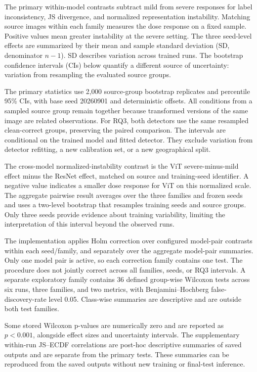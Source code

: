 The primary within-model contrasts subtract mild from severe responses for label inconsistency, JS divergence, and normalized representation instability. Matching source images within each family measures the dose response on a fixed sample. Positive values mean greater instability at the severe setting. The three seed-level effects are summarized by their mean and sample standard deviation (SD, denominator \(n-1\)). SD describes variation across trained runs. The bootstrap confidence intervals (CIs) below quantify a different source of uncertainty: variation from resampling the evaluated source groups.

The primary statistics use 2,000 source-group bootstrap replicates and percentile 95\% CIs, with base seed 20260901 and deterministic offsets. All conditions from a sampled source group remain together because transformed versions of the same image are related observations. For RQ3, both detectors use the same resampled clean-correct groups, preserving the paired comparison. The intervals are conditional on the trained model and fitted detector. They exclude variation from detector refitting, a new calibration set, or a new geographical split.

The cross-model normalized-instability contrast is the ViT severe-minus-mild effect minus the ResNet effect, matched on source and training-seed identifier. A negative value indicates a smaller dose response for ViT on this normalized scale. The aggregate pairwise result averages over the three families and frozen seeds and uses a two-level bootstrap that resamples training seeds and source groups. Only three seeds provide evidence about training variability, limiting the interpretation of this interval beyond the observed runs.

The implementation applies Holm correction over configured model-pair contrasts within each seed/family, and separately over the aggregate model-pair summaries. Only one model pair is active, so each correction family contains one test. The procedure does not jointly correct across all families, seeds, or RQ3 intervals. A separate exploratory family contains 36 defined group-wise Wilcoxon tests across six runs, three families, and two metrics, with Benjamini--Hochberg false-discovery-rate level 0.05. Class-wise summaries are descriptive and are outside both test families.

Some stored Wilcoxon p-values are numerically zero and are reported as \(p<0.001\), alongside effect sizes and uncertainty intervals. The supplementary within-run JS--ECDF correlations are post-hoc descriptive summaries of saved outputs and are separate from the primary tests. These summaries can be reproduced from the saved outputs without new training or final-test inference.
